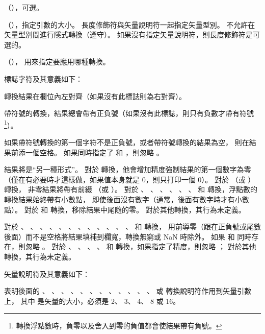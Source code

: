 \item {}（{}），可選。

\item {}（{}），指定引數的大小。
長度修飾符與矢量說明符一起指定矢量型別。
不允許在矢量型別間進行隱式轉換（遵守）。
如果沒有指定矢量說明符，則長度修飾符是可選的。

\item {}（{}），
用來指定要應用哪種轉換。
\stopigBase

標誌字符及其意義如下：

\startclSpecifier{\cemp{-}}
轉換結果在欄位內左對齊（如果沒有此標誌則為右對齊）。
\stopclSpecifier

\startclSpecifier{\cemp{+}}
帶符號的轉換，結果總會帶有正負號（如果沒有此標誌，則只有負數才帶有符號\footnote{
轉換浮點數時，負零以及舍入到零的負值都會使結果帶有負號。}）。
\stopclSpecifier

如果帶符號轉換的第一個字符不是正負號，或者帶符號轉換的結果為空，
則在結果前添一個空格。
如果同時指定了  和 \ccmm{+}，則忽略 。
\stopclSpecifier

\startbuffer
\cemp{#}
\stopbuffer
\startclSpecifier{\getbuffer}
結果將是“另一種形式”。
對於  轉換，他會增加精度強制結果的第一個數字為零
（僅在有必要時才這樣做，如果值本身就是 0，則只打印一個 0）。
對於  （或 ）轉換，
非零結果將帶有前綴  （或 ）。
對於 、 、 、 、 、
 、  和  轉換，浮點數的轉換結果始終帶有小數點，
即使後面沒有數字（通常，後面有數字時才有小數點）。
對於  和  轉換，{}移除結果中尾隨的零。
對於其他轉換，其行為未定義。
\stopclSpecifier

對於 、 、 、 、 、
 、 、 、 、 、
 、 、  和  轉換，
用前導零（跟在正負號或尾數後面）而不是空格將結果填補到欄寬，轉換無窮或 NaN 時除外。
如果  和 \cemp{-} 同時存在，則忽略 。
對於 、 、 、 、  和
  轉換，如果指定了精度，則忽略 ；
對於其他轉換，其行為未定義。
\stopclSpecifier

矢量說明符及其意義如下：

表明後面的 、 、 、 、
 、 、 、 、
 、 、 、 、
  或  轉換說明符作用到矢量引數上，
其中  是矢量的大小，必須是 2、 3、 4、 8 或 16。


